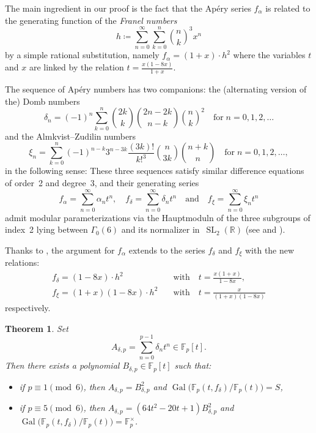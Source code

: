 \documentclass{article}
\newcommand{\F}{\mathbb{F}}
\DeclareMathOperator{\Gal}{Gal}
\theoremstyle{definition}
\theoremstyle{plain}
\newtheorem{thm}[defi]{Theorem}
\theoremstyle{remark}
\begin{document}
The main ingredient in our proof is the fact that the Apéry series $f_\alpha$ is related to the generating function of the \emph{Franel numbers} \[h\coloneqq \sum_{n=0}^\infty \sum_{k=0}^{n}\binom{n}{k}^3x^n\] by a simple rational substitution, namely
$f_\alpha = (1+x)\cdot h^2$ where the variables $t$ and $x$ are linked by the relation
$t = \frac {x(1-8x)}{1+x}$.

The sequence of Ap\'ery numbers has two companions:
the (alternating version of the) Domb numbers
\begin{equation*}
\delta_n = (-1)^n\sum_{k=0}^n \binom{2k}k\binom{2n-2k}{n-k}{\binom nk}^2
\quad\text{for}\; n=0,1,2,\dots
\end{equation*}
and the Almkvist--Zudilin numbers
\begin{equation*}
\xi_n=\sum_{k=0}^n(-1)^{n-k}3^{n-3k}\frac{(3k)!}{k!^3}\binom n{3k}\binom{n+k}n
\quad\text{for}\; n=0,1,2,\dots,
\end{equation*}
in the following sense:
These three sequences satisfy similar difference equations of order~2 and degree~3, and their generating series
\begin{equation*}
f_\alpha = \sum_{n=0}^\infty\alpha_n t^n,
\quad
f_\delta = \sum_{n=0}^\infty\delta_n t^n
\quad\text{and}\quad
f_\xi = \sum_{n=0}^\infty\xi_n t^n
\end{equation*}
admit modular parameterizations via the Hauptmoduln of the three subgroups of index~2
lying between $\Gamma_0(6)$ and its normalizer in~$\operatorname{SL}_2(\mathbb R)$
(see \cite{Chan-Verrill} and \cite{Chan-Zudilin}).

Thanks to \cite[Theorem 2.2]{Chan-Zudilin}, the argument for $f_\alpha$ extends to the series $f_\delta$ and $f_\xi$ with the new relations:
\begin{align*}
f_\delta = (1-8x) \cdot h^2 & \quad \text{with} \quad t = \frac{x(1+x)}{1-8x}, \\
f_\xi = (1+x)(1-8x) \cdot h^2 & \quad \text{with} \quad t = \frac{x}{(1+x)(1-8x)} 
\end{align*}
respectively.

\begin{thm}
\label{thm:domb}
Set
\[
A_{\delta,p}=\sum_{n=0}^{p-1}\delta_nt^n\in\mathbb F_p[t].
\]
Then there exists a polynomial $B_{\delta,p} \in \F_p[t]$ such that:
\begin{itemize}
\item if $p \equiv 1 \pmod{6}$, then $A_{\delta,p} = B_{\delta,p}^2$ and $\Gal\big(\F_p(t, f_\delta)/\F_p(t)\big) = S$,
\item if $p \equiv 5 \pmod{6}$, then $A_{\delta,p} = (64t^2-20t+1) B_{\delta,p}^2$ and $\Gal\big(\F_p(t, f_\delta)/\F_p(t)\big) = \F_p^\times$.
\end{itemize}
\end{thm}
\end{document}
